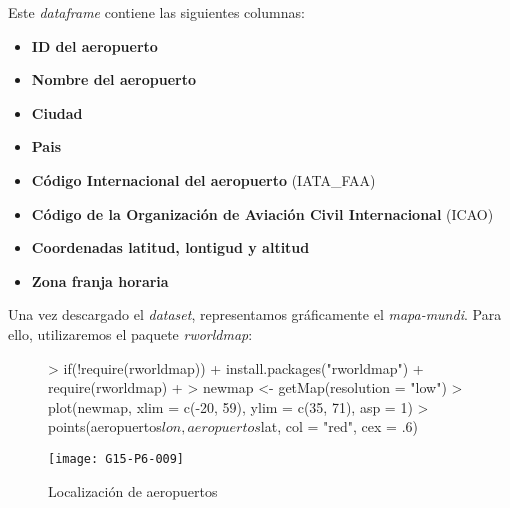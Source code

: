 \documentclass [a4paper] {article}
\begin{document}
\newpage
Este \textit{dataframe} contiene las siguientes columnas:
\begin{itemize}
  \item \textbf{ID del aeropuerto}
  \item \textbf{Nombre del aeropuerto}
  \item \textbf{Ciudad}
  \item \textbf{Pais}
  \item \textbf{Código Internacional del aeropuerto} (IATA\_FAA)
  \item \textbf{Código de la Organización de Aviación Civil Internacional} (ICAO)
  \item \textbf{Coordenadas latitud, lontigud y altitud}
  \item \textbf{Zona franja horaria}
\end{itemize}

Una vez descargado el \textit{dataset}, representamos gráficamente el \textit{mapa-mundi}. Para ello, utilizaremos el paquete \textit{rworldmap}:
\begin{figure}[htbp!]
\centering
\begin{Schunk}
\begin{Sinput}
> if(!require(rworldmap)){
+   install.packages("rworldmap")
+   require(rworldmap)
+ }
> newmap <- getMap(resolution = "low")
> plot(newmap, xlim = c(-20, 59), ylim = c(35, 71), asp = 1)
> points(aeropuertos$lon, aeropuertos$lat, col = "red", cex = .6)
\end{Sinput}
\end{Schunk}
\texttt{[image: G15-P6-009]}
\caption{Localización de aeropuertos}
\end{figure}
\newpage
\end{document}
